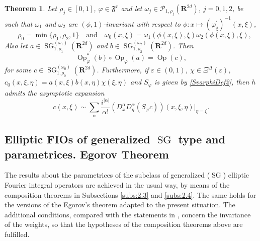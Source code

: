 \documentclass[12pt,a4paper,reqno]{amsart}
\numberwithin{equation}{section}
\newtheorem{thm}{Theorem}
\numberwithin{thm}{section}
\theoremstyle{definition}
\theoremstyle{remark}
\begin{document}
\begin{thm}
\label{thm:3.5}
Let $\rho _j\in [0,1]$, $\varphi \in {\mathfrak{F}^r}$ and let $\omega _j
\in {\mathscr P}_{1,\rho _j}({\mathbf R^{{2d}}})$, $j=0,1,2$, be such that $\omega _1$ and
$\omega _2$ are $(\phi,1)$-invariant
with respect to $\phi \colon
x \mapsto (\varphi ^\prime _\xi )^{-1}(x,\xi)$,
$$
\quad \rho _0=\min\{ \rho _1,\rho _2,1\} \quad \text{and}
\quad \omega _0(x,\xi ) =\omega_1(\phi (x,\xi ),\xi )\omega_{2}(\phi (x,\xi ),\xi ),
$$
Also let $a \in {\operatorname{SG}}^{(\omega _1)} _{1,\rho _1}({\mathbf R^{{2d}}})$ and
$b \in {\operatorname{SG}}^{(\omega _2)}_{1,\rho _2}({\mathbf R^{{2d}}})$.
Then
\begin{equation*}
{\operatorname{Op}} _\varphi ^*(b) \circ {\operatorname{Op}} _\varphi (a) = {\operatorname{Op}} (c),
\end{equation*}
for some $c \in {\operatorname{SG}}^{(\omega _0)}_{1,\rho _0}({\mathbf R^{{2d}}})$.
Furthermore, if ${\varepsilon} \in (0,1)$, $\chi \in \Xi ^\Delta ({\varepsilon} )$,
$c_0(x,\xi ,\eta )= a(x,\xi )b(x,\eta )\chi (\xi ,\eta )$ and $S_{\varphi}$ is given by
\eqref{SvarphiDef2}, then $h$ admits the asymptotic expansion
\begin{equation*}
c(x,\xi) \sim \sum _{\alpha} \frac{i^{|\alpha |}}{\alpha !} 
(D^\alpha _xD^\alpha_\eta (S_{\varphi} c))(x,\xi ,\eta ) \big |_{\eta =\xi}.
\end{equation*}
\end{thm}

\subsection{Elliptic FIOs of generalized ${\operatorname{SG}}$ type and parametrices. Egorov Theorem}
\label{sec:2.5}
The results about the parametrices of the subclass of
generalized (${\operatorname{SG}}$) elliptic  Fourier integral operators
are achieved in the usual way, by means of the composition
theorems in Subsections \ref{subs:2.3} and \ref{subs:2.4}.
The same holds for the versions of the Egorov's theorem
adapted to the present situation. The additional conditions,
compared with the statements in \cite{coriasco}, concern
the invariance of the weights, so that the hypotheses of
the composition theorems above are fulfilled. 
\end{document}
